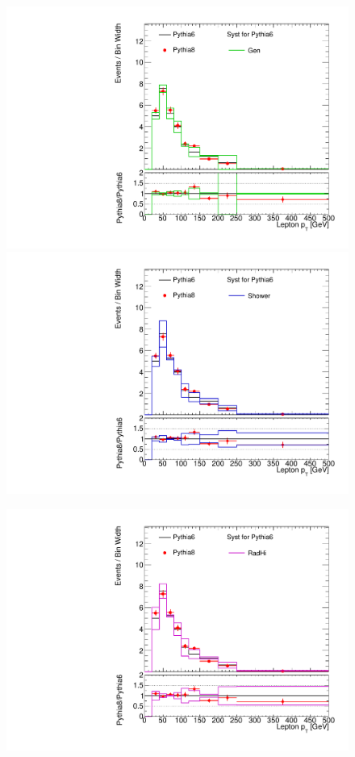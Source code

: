 \begin{figure}[!h]
\begin{center}
\includegraphics[scale=0.33]{./figures/boosted/TTBarPy6VsPy8/TTBarPy6VsPy8_SR_LepPt_gen}    
\includegraphics[scale=0.33]{./figures/boosted/TTBarPy6VsPy8/TTBarPy6VsPy8_SR_LepPt_shower} \\
\par\medskip
\includegraphics[scale=0.33]{./figures/boosted/TTBarPy6VsPy8/TTBarPy6VsPy8_SR_LepPt_radhi}

\end{center}
\end{figure}
